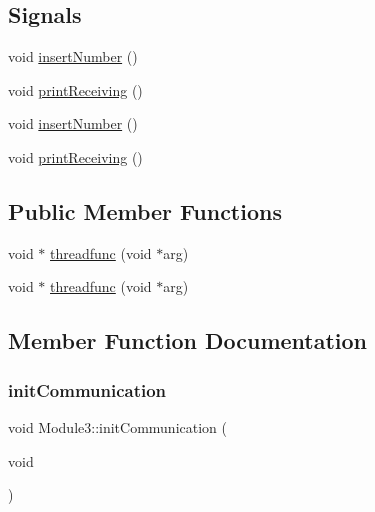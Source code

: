 \subsection*{Signals}
\begin{DoxyCompactItemize}
\item 
void \mbox{\hyperlink{class_module3_a2fee494b81b29cb56c1d860a5306adf2}{insert\+Number}} ()
\item 
void \mbox{\hyperlink{class_module3_ab15973c4f5ceb61037de263982e3989a}{print\+Receiving}} ()
\item 
void \mbox{\hyperlink{class_module3_a2fee494b81b29cb56c1d860a5306adf2}{insert\+Number}} ()
\item 
void \mbox{\hyperlink{class_module3_ab15973c4f5ceb61037de263982e3989a}{print\+Receiving}} ()
\end{DoxyCompactItemize}
\subsection*{Public Member Functions}
\begin{DoxyCompactItemize}
\item 
void $\ast$ \mbox{\hyperlink{class_module3_a21e8c133eee38224201d9826a6b08894}{threadfunc}} (void $\ast$arg)
\item 
void $\ast$ \mbox{\hyperlink{class_module3_a38ac22b1c247687546a3b27dffc8e26a}{threadfunc}} (void $\ast$arg)
\end{DoxyCompactItemize}


\subsection{Member Function Documentation}
\mbox{\label{class_module3_ac66437d00aebddd32dc0618de74ea5a3}} 
\subsubsection{\texorpdfstring{init\+Communication}{initCommunication}\hspace{0.1cm}{\footnotesize\ttfamily [1/2]}}
{\footnotesize\ttfamily void Module3\+::init\+Communication (\begin{DoxyParamCaption}\item[{void}]{ }\end{DoxyParamCaption})\hspace{0.3cm}{\ttfamily [slot]}}


